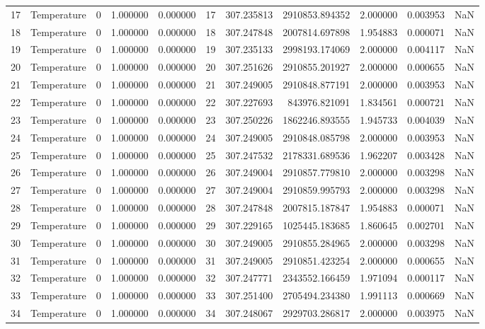 \begin{tabular}{llrrrrrrrrr}
17 & Temperature & 0 & 1.000000 & 0.000000 & 17 & 307.235813 & 2910853.894352 & 2.000000 & 0.003953 & NaN \\
18 & Temperature & 0 & 1.000000 & 0.000000 & 18 & 307.247848 & 2007814.697898 & 1.954883 & 0.000071 & NaN \\
19 & Temperature & 0 & 1.000000 & 0.000000 & 19 & 307.235133 & 2998193.174069 & 2.000000 & 0.004117 & NaN \\
20 & Temperature & 0 & 1.000000 & 0.000000 & 20 & 307.251626 & 2910855.201927 & 2.000000 & 0.000655 & NaN \\
21 & Temperature & 0 & 1.000000 & 0.000000 & 21 & 307.249005 & 2910848.877191 & 2.000000 & 0.003953 & NaN \\
22 & Temperature & 0 & 1.000000 & 0.000000 & 22 & 307.227693 & 843976.821091 & 1.834561 & 0.000721 & NaN \\
23 & Temperature & 0 & 1.000000 & 0.000000 & 23 & 307.250226 & 1862246.893555 & 1.945733 & 0.004039 & NaN \\
24 & Temperature & 0 & 1.000000 & 0.000000 & 24 & 307.249005 & 2910848.085798 & 2.000000 & 0.003953 & NaN \\
25 & Temperature & 0 & 1.000000 & 0.000000 & 25 & 307.247532 & 2178331.689536 & 1.962207 & 0.003428 & NaN \\
26 & Temperature & 0 & 1.000000 & 0.000000 & 26 & 307.249004 & 2910857.779810 & 2.000000 & 0.003298 & NaN \\
27 & Temperature & 0 & 1.000000 & 0.000000 & 27 & 307.249004 & 2910859.995793 & 2.000000 & 0.003298 & NaN \\
28 & Temperature & 0 & 1.000000 & 0.000000 & 28 & 307.247848 & 2007815.187847 & 1.954883 & 0.000071 & NaN \\
29 & Temperature & 0 & 1.000000 & 0.000000 & 29 & 307.229165 & 1025445.183685 & 1.860645 & 0.002701 & NaN \\
30 & Temperature & 0 & 1.000000 & 0.000000 & 30 & 307.249005 & 2910855.284965 & 2.000000 & 0.003298 & NaN \\
31 & Temperature & 0 & 1.000000 & 0.000000 & 31 & 307.249005 & 2910851.423254 & 2.000000 & 0.000655 & NaN \\
32 & Temperature & 0 & 1.000000 & 0.000000 & 32 & 307.247771 & 2343552.166459 & 1.971094 & 0.000117 & NaN \\
33 & Temperature & 0 & 1.000000 & 0.000000 & 33 & 307.251400 & 2705494.234380 & 1.991113 & 0.000669 & NaN \\
34 & Temperature & 0 & 1.000000 & 0.000000 & 34 & 307.248067 & 2929703.286817 & 2.000000 & 0.003975 & NaN \\

\end{tabular}
